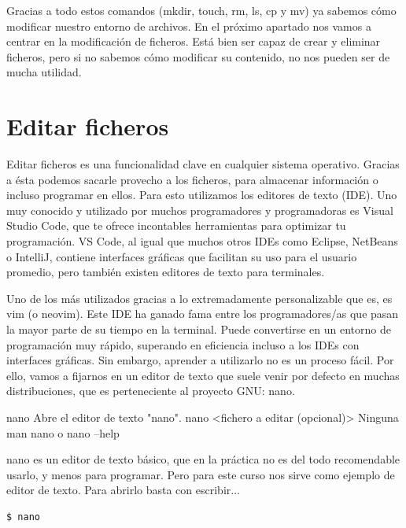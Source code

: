 Gracias a todo estos comandos (mkdir, touch, rm, ls, cp y mv) ya sabemos cómo modificar nuestro entorno de archivos. En el próximo apartado nos vamos a centrar en la modificación de ficheros. Está bien ser capaz de crear y eliminar ficheros, pero si no sabemos cómo modificar su contenido, no nos pueden ser de mucha utilidad.

\section{Editar ficheros}
Editar ficheros es una funcionalidad clave en cualquier sistema operativo. Gracias a ésta podemos sacarle provecho a los ficheros, para almacenar información o incluso programar en ellos. Para esto utilizamos los editores de texto (IDE). Uno muy conocido y utilizado por muchos programadores y programadoras es Visual Studio Code, que te ofrece incontables herramientas para optimizar tu programación. VS Code, al igual que muchos otros IDEs como Eclipse, NetBeans o IntelliJ, contiene interfaces gráficas que facilitan su uso para el usuario promedio, pero también existen editores de texto para terminales.



Uno de los más utilizados gracias a lo extremadamente personalizable que es, es vim (o neovim). Este IDE ha ganado fama entre los programadores/as que pasan la mayor parte de su tiempo en la terminal. Puede convertirse en un entorno de programación muy rápido, superando en eficiencia incluso a los IDEs con interfaces gráficas. Sin embargo, aprender a utilizarlo no es un proceso fácil. Por ello, vamos a fijarnos en un editor de texto que suele venir por defecto en muchas distribuciones, que es perteneciente al proyecto GNU: nano.

\begin{command-info}
{nano}
{Abre el editor de texto "nano".}
{nano <fichero a editar (opcional)>}
{Ninguna}
{man nano o nano --help}
\end{command-info}

nano es un editor de texto básico, que en la práctica no es del todo recomendable usarlo, y menos para programar. Pero para este curso nos sirve como ejemplo de editor de texto. Para abrirlo basta con escribir...

\begin{tcolorbox-code}
\begin{lstlisting}
$ nano
\end{lstlisting}
\end{tcolorbox-code}

